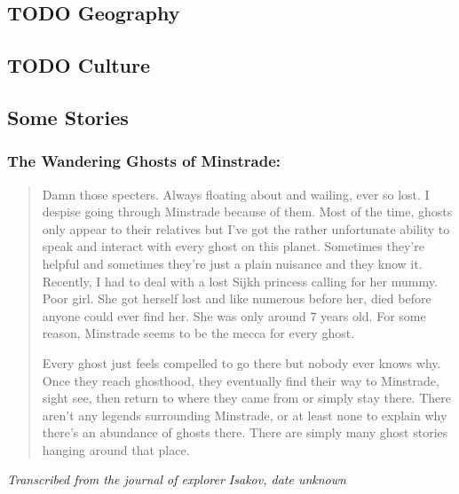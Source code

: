 \documentclass[11pt]{article}
\begin{document}
\subsection*{{\bfseries\sffamily TODO} Geography}
\label{sec:org63af123}
\subsection*{{\bfseries\sffamily TODO} Culture}
\label{sec:org3b13568}
\subsection*{Some Stories}
\label{sec:org557fc4c}
\subsubsection*{The Wandering Ghosts of Minstrade:}
\label{sec:orgde4d8cd}
\begin{quote}
Damn those specters.  Always floating about and wailing, ever so lost.  I despise going through Minstrade because of them.  Most of the time, ghosts only appear to their relatives but I've got the rather unfortunate ability to speak and interact with every ghost on this planet. Sometimes they're helpful and sometimes they're just a plain nuisance and they know it.  Recently, I had to deal with a lost Sijkh princess calling for her mummy.  Poor girl.  She got herself lost and like numerous before her, died before anyone could ever find her.  She was only around 7 years old.  For some reason, Minstrade seems to be the mecca for every ghost.

Every ghost just feels compelled to go there but nobody ever knows why.  Once they reach ghosthood, they eventually find their way to Minstrade, sight see, then return to where they came from or simply stay there.  There aren't any legends surrounding Minstrade, or at least none to explain why there's an abundance of ghosts there.  There are simply many ghost stories hanging around that place.
\end{quote}
\emph{Transcribed from the journal of explorer Isakov, date unknown}
\end{document}
